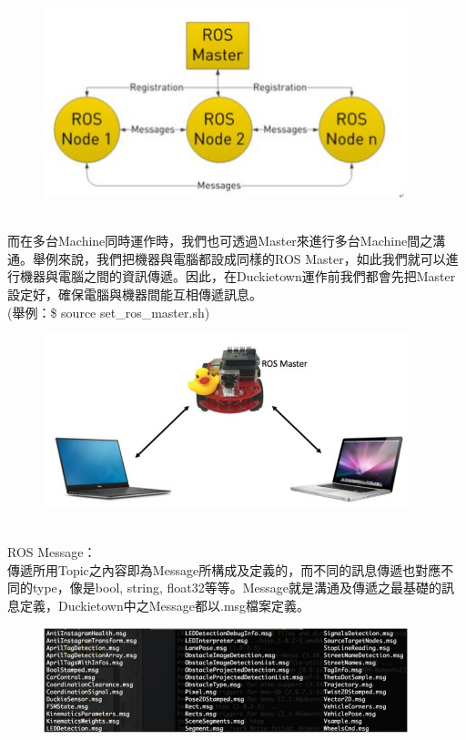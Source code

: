 \documentclass{article}
\begin{document}
\begin{figure}[htp]
    \begin{center}
        \includegraphics[width=300pt]{pic/圖片20.jpg}
    \end{center}
\end{figure}
\\而在多台Machine同時運作時，我們也可透過Master來進行多台Machine間之溝通。舉例來說，我們把機器與電腦都設成同樣的ROS Master，如此我們就可以進行機器與電腦之間的資訊傳遞。因此，在Duckietown運作前我們都會先把Master設定好，確保電腦與機器間能互相傳遞訊息。 
\\(舉例：\$ source set\_ros\_master.sh)
\begin{figure}[htp]
    \begin{center}
        \includegraphics[width=300pt]{pic/圖片21.jpg}
    \end{center}
\end{figure}
\\ROS Message：
\\傳遞所用Topic之內容即為Message所構成及定義的，而不同的訊息傳遞也對應不同的type，像是bool, string, float32等等。Message就是溝通及傳遞之最基礎的訊息定義，Duckietown中之Message都以.msg檔案定義。
\begin{figure}[htp]
    \begin{center}
        \includegraphics[width=300pt]{pic/圖片22.jpg}
    \end{center}
\end{figure}
\end{document}
